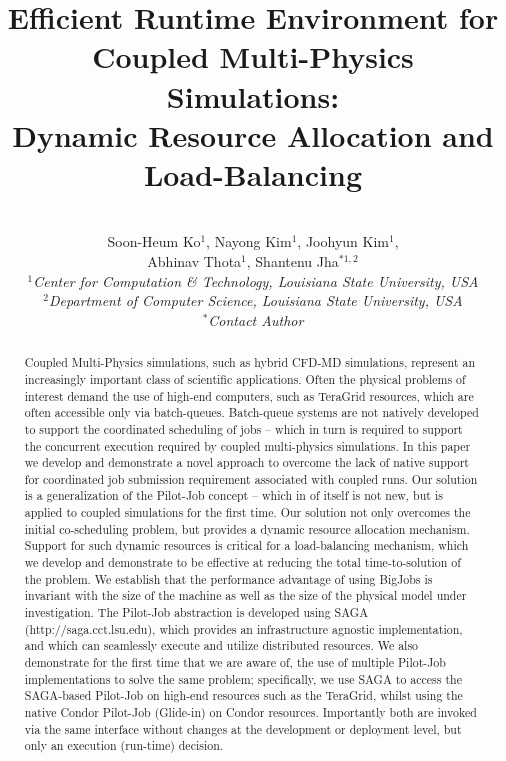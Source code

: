 \documentclass[conference,final]{IEEEtran}
\title{Efficient Runtime Environment for Coupled Multi-Physics Simulations: \\
Dynamic Resource Allocation and Load-Balancing}
\author{
 ~\\[-2em]
 Soon-Heum Ko$^{1}$, Nayong Kim$^{1}$, Joohyun Kim$^{1}$, \\ Abhinav Thota$^{1}$, Shantenu Jha$^{*1,2}$\\
 \small{\emph{$^{1}$Center for Computation \& Technology, Louisiana State University, USA}}\\
 \small{\emph{$^{2}$Department of Computer Science, Louisiana State University, USA}}\\
 \small{\emph{$^{*}$Contact Author}}\\
}
\newcommand{\up}{\vspace*{-1em}}
\begin{document}
\maketitle

\begin{abstract}
  Coupled Multi-Physics simulations, such as hybrid CFD-MD
  simulations, represent an increasingly important class of scientific
  applications.  Often the physical problems of interest demand the
  use of high-end computers, such as TeraGrid resources, which are
  often accessible only via batch-queues. Batch-queue systems are not
  natively developed to support the coordinated scheduling of jobs --
  which in turn is required to support the concurrent execution
  required by coupled multi-physics simulations. In this paper we
  develop and demonstrate a novel approach to overcome the lack of
  native support for coordinated job submission requirement associated
  with coupled runs. Our solution is a generalization of the Pilot-Job
  concept -- which in of itself is not new, but is applied to coupled
  simulations for the first time. Our solution not only overcomes the
  initial co-scheduling problem, but provides a dynamic resource
  allocation mechanism. Support for such dynamic resources is critical
  for a load-balancing mechanism, which we develop and demonstrate to
  be effective at reducing the total time-to-solution of the
  problem. We establish that the performance advantage of using
  BigJobs is invariant with the size of the machine as well as the
  size of the physical model under investigation.  The Pilot-Job
  abstraction is developed using SAGA (http://saga.cct.lsu.edu), which
  provides an infrastructure agnostic implementation, and which can
  seamlessly execute and utilize distributed resources. We also
  demonstrate for the first time that we are aware of, the use of
  multiple Pilot-Job implementations to solve the same problem;
  specifically, we use SAGA to access the SAGA-based Pilot-Job on
  high-end resources such as the TeraGrid, whilst using the native
  Condor Pilot-Job (Glide-in) on Condor resources. Importantly both
  are invoked via the same interface without changes at the
  development or deployment level, but only an execution (run-time)
  decision.
\end{abstract}
\up\up
\end{document}
